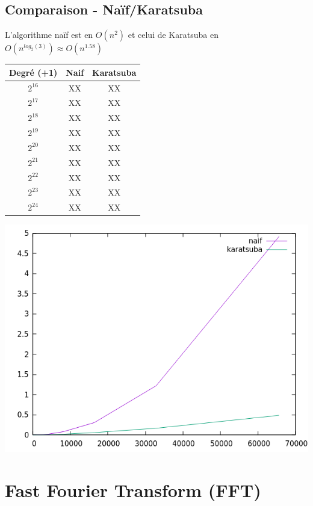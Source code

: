 \documentclass[12pt, a4paper]{article}
\begin{document}
\subsection{Comparaison - Naïf/Karatsuba}
L'algorithme naïf est en $O(n^2)$ et celui de Karatsuba en $O(n^{log_2(3)}) \approx O(n^{1.58})$ \\

\begin{center}
\begin{tabular}{||c c c||}
\hline
Degré (+1) & Naif & Karatsuba \\
\hline\hline
$2^{16}$ & XX & XX \\
\hline
$2^{17}$ & XX & XX \\
\hline
$2^{18}$ & XX & XX \\
\hline
$2^{19}$ & XX & XX \\
\hline
$2^{20}$ & XX & XX \\
\hline
$2^{21}$ & XX & XX \\
\hline
$2^{22}$ & XX & XX \\
\hline
$2^{23}$ & XX & XX \\
\hline
$2^{24}$ & XX & XX \\
\hline
\end{tabular}
\end{center}

\includegraphics[scale=1]{naif_kara}\\

\section{Fast Fourier Transform (FFT)}
\end{document}
